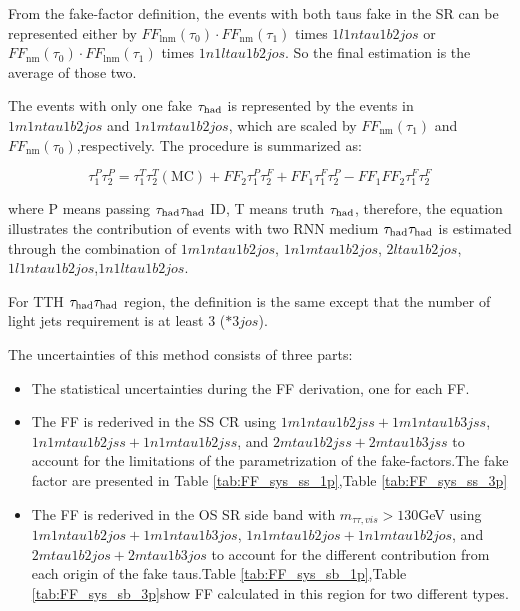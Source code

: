 From the fake-factor definition, the events with both taus fake in the SR can be represented either by $F F_{\operatorname{lnm}}\left(\tau_{0}\right) \cdot F F_{\mathrm{nm}}\left(\tau_{1}\right)$ times $1l1ntau1b2jos$ or $F F_{\mathrm{nm}}\left(\tau_{0}\right) \cdot F F_{\mathrm{lnm}}\left(\tau_{1}\right)$ times $1n1ltau1b2jos$. So the final estimation is the average of those two.

The events with only one fake $\tau_\text{had}$ is represented by the events in $1m1ntau1b2jos$ and $1n1mtau1b2jos$, which are scaled by $F F_{\mathrm{nm}}\left(\tau_{1}\right)$ and $F F_{\mathrm{nm}}\left(\tau_{0}\right)$,respectively. The procedure is summarized as:

\begin{equation}
\tau_{1}^{P} \tau_{2}^{P}=\tau_{1}^{T} \tau_{2}^{T}(\mathrm{MC})+F F_{2} \tau_{1}^{P} \tau_{2}^{F}+F F_{1} \tau_{1}^{F} \tau_{2}^{P}-F F_{1} F F_{2} \tau_{1}^{F} \tau_{2}^{F}
\end{equation}

where P means passing $\tau_\text{had}{}\tau_\text{had}$ ID, T means truth $\tau_\text{had}$, therefore, the equation illustrates the contribution of events with two RNN medium $\tau_\text{had}{}\tau_\text{had}$ is estimated through the combination of $1m1ntau1b2jos$, $1n1mtau1b2jos$, $2ltau1b2jos$,$1l1ntau1b2jos$,$1n1ltau1b2jos$.

For TTH $\tau_\text{had}{}\tau_\text{had}$ region, the definition is the same except that the number of light jets requirement is at least 3 ($*3jos$). 

The uncertainties of this method consists of three parts:
\begin{itemize}

\item The statistical uncertainties during the FF derivation, one for each FF.

\item The FF is rederived in the SS CR using $1m1ntau1b2jss+1m1ntau1b3jss$, $1n1mtau1b2jss+1n1mtau1b2jss$, and $2mtau1b2jss+2mtau1b3jss$ to account for the limitations of the parametrization of the fake-factors.The fake factor are presented in Table \ref{tab:FF_sys_ss_1p},Table \ref{tab:FF_sys_ss_3p}

\item The FF is rederived in the OS SR side band with $m_{\tau\tau,vis}>130$GeV using $1m1ntau1b2jos+1m1ntau1b3jos$, $1n1mtau1b2jos+1n1mtau1b2jos$, and $2mtau1b2jos+2mtau1b3jos$ to account for the different contribution from each origin of the fake taus.Table \ref{tab:FF_sys_sb_1p},Table \ref{tab:FF_sys_sb_3p}show FF calculated in this region for two different types.

\end{itemize}


